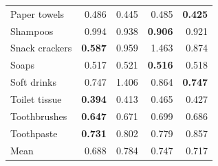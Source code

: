 \begin{table}[t]
\begin{tabular}{lrrrr}
Paper towels & 0.486 & 0.445 & 0.485 & \textbf{0.425} \\
Shampoos & 0.994 & 0.938 & \textbf{0.906} & 0.921 \\
Snack crackers & \textbf{0.587} & 0.959 & 1.463 & 0.874 \\
Soaps & 0.517 & 0.521 & \textbf{0.516} & 0.518 \\
Soft drinks & 0.747 & 1.406 & 0.864 & \textbf{0.747} \\
Toilet tissue & \textbf{0.394} & 0.413 & 0.465 & 0.427 \\
Toothbrushes & \textbf{0.647} & 0.671 & 0.699 & 0.686 \\
Toothpaste & \textbf{0.731} & 0.802 & 0.779 & 0.857 \\
\midrule
Mean & 0.688 & 0.784 & 0.747 & 0.717 \\
\bottomrule
\end{tabular}
\end{table}
